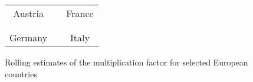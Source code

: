 \documentclass[12pt]{article}
\begin{document}
\begin{figure}[htp]%
\caption
{Rolling estimates of the multiplication factor for selected European countries}%
\vspace{-0.2cm}%
\label{fig: Euro_MF}%

\begin{footnotesize}%


\begin{center}%
\begin{tabular}
[c]{ccc}%
Austria &  & France\\%
{\includegraphics[
height=1.9951in,
width=2.6524in
]%
{figs/Austria_ER_N50000_guess5_2W_MF.png}%
}
&  &
{\includegraphics[
height=1.9951in,
width=2.6524in
]%
{figs/France_ER_N50000_guess5_2W_MF.png}%
}
\\
&  & \\
Germany &  & Italy\\%

\end{tabular}
\end{center}
\end{footnotesize}
\end{figure}
\end{document}
